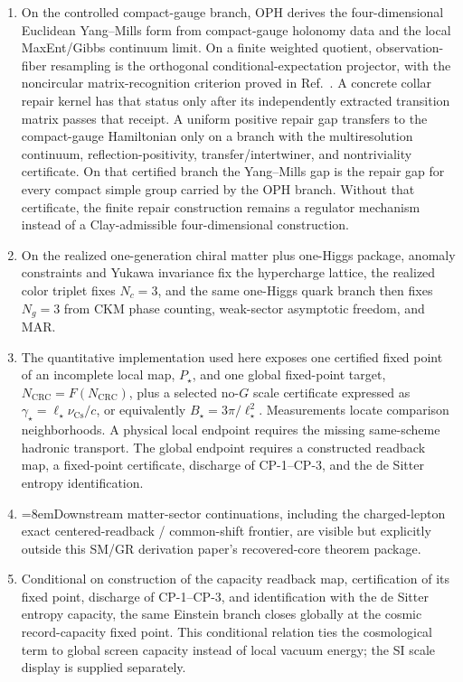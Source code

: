 \documentclass[11pt]{article}
\begin{document}
\begin{enumerate}[leftmargin=2em]
\item On the controlled compact-gauge branch, OPH derives the four-dimensional
Euclidean Yang--Mills form from compact-gauge holonomy data and the local MaxEnt/Gibbs
continuum limit. On a finite weighted quotient, observation-fiber resampling is the orthogonal
conditional-expectation projector, with the noncircular matrix-recognition criterion proved in
Ref.~\cite{observableNormalForms}. A concrete collar repair kernel has that status only after its
independently extracted transition matrix passes that receipt. A uniform positive repair gap
transfers to the compact-gauge Hamiltonian only on a
branch with the multiresolution continuum, reflection-positivity, transfer/intertwiner, and
nontriviality certificate. On that certified branch the Yang--Mills gap is the repair gap for
every compact simple group carried by the OPH branch. Without that certificate, the finite repair
construction remains a regulator mechanism instead of a Clay-admissible four-dimensional
construction.
\item On the realized one-generation chiral matter plus one-Higgs package, anomaly constraints and Yukawa invariance fix the hypercharge lattice, the realized color triplet fixes \(N_c=3\), and the same one-Higgs quark branch then fixes \(N_g=3\) from CKM phase counting, weak-sector asymptotic freedom, and MAR.
\item The quantitative implementation used here exposes one certified fixed point of an incomplete local map, \(P_\star\), and one global fixed-point target, \(N_{\mathrm{CRC}}=F(N_{\mathrm{CRC}})\), plus a selected no-\(G\) scale certificate expressed as \(\gamma_\star=\ell_\star\nu_{\mathrm{Cs}}/c\), or equivalently \(B_\star=3\pi/\ell_\star^2\). Measurements locate comparison neighborhoods. A physical local endpoint requires the missing same-scheme hadronic transport. The global endpoint requires a constructed readback map, a fixed-point certificate, discharge of CP-1--CP-3, and the de Sitter entropy identification.
\item {\emergencystretch=8em\relax Downstream matter-sector continuations, including the charged-lepton exact centered-readback / common-shift frontier, are visible but explicitly outside this SM/GR derivation paper's recovered-core theorem package.\par}
\item Conditional on construction of the capacity readback map, certification of its fixed point, discharge of CP-1--CP-3, and identification with the de Sitter entropy capacity, the same Einstein branch closes globally at the cosmic record-capacity fixed point. This conditional relation ties the cosmological term to global screen capacity instead of local vacuum energy; the SI scale display is supplied separately.

\end{enumerate}
\end{document}
